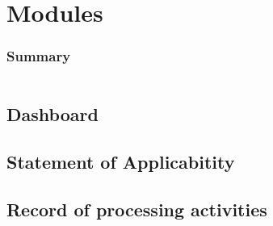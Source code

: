 %
%
\section{Modules}
\begin{frame}
    \frametitle{Summary}
    \begin{columns}[t]
        \begin{column}{5cm}
            \tableofcontents[sections={1-3}, currentsection, hideothersubsections]
        \end{column}
        \begin{column}{5cm}
            \tableofcontents[sections={4-5}, currentsection, hideothersubsections]
        \end{column}
    \end{columns}
\end{frame}
\subsection{Dashboard}
\begin{frame}
    \frametitle{}
    \framesubtitle{}
\end{frame}


\subsection{Statement of Applicabitity}
\begin{frame}
    \frametitle{}
    \framesubtitle{}
\end{frame}


\subsection{Record of processing activities}
\begin{frame}
    \frametitle{}
    \framesubtitle{}
\end{frame}
